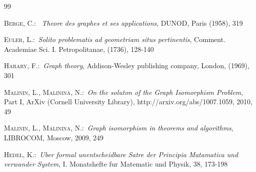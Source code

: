 \documentclass{amsart}
\theoremstyle{plain}
\numberwithin{equation}{section}
\begin{document}
\begin {thebibliography} {99}

 \textsc{Berge, C.}:\ \textit{ Theore des graphes et ses applications}, DUNOD, Paris (1958), 319

 \textsc{Euler, L.}:\ \textit{Solito problematis ad geometriam situs pertinentis}, Comment. Academiae Sci. I. Petropolitanae, (1736), 128-140

 \textsc{Harary, F.}:\ \textit{Graph theory}, Addison-Wesley publishing company, London, (1969), 301

 \textsc{Malinin, L., Malinina, N.}:\ \textit{On the soluton of the Graph Isomorphism Problem}, Part I, ArXiv (Cornell University Library), http://arxiv.org/abs/1007.1059, 2010, 49

 \textsc{Malinin, L., Malinina, N.}:\ \textit{Graph isomorphism in theorems and algorithms}, LIBROCOM, Moscow, 2009, 249

 \textsc{Hedel, K.}:\ \textit{Uber formal unentscheidbare Satre der Principia Matamatica und verwander System}, I. Monatshefte fur Matematic und Physik, 38, 173-198

\end {thebibliography} 
\end{document}
